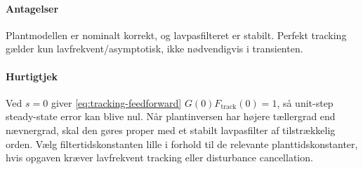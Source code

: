 \paragraph{Antagelser}
Plantmodellen er nominalt korrekt, og lavpasfilteret er stabilt. Perfekt tracking gælder
kun lavfrekvent/asymptotisk, ikke nødvendigvis i transienten.

\paragraph{Hurtigtjek}
Ved \(s=0\) giver \eqref{eq:tracking-feedforward} \(G(0)F_{\mathrm{track}}(0)=1\), så
unit-step steady-state error kan blive nul.
Når plantinversen har højere tællergrad end nævnergrad, skal den gøres proper med et
stabilt lavpasfilter af tilstrækkelig orden. Vælg filtertidskonstanten lille i forhold
til de relevante planttidskonstanter, hvis opgaven kræver lavfrekvent tracking eller
disturbance cancellation.
